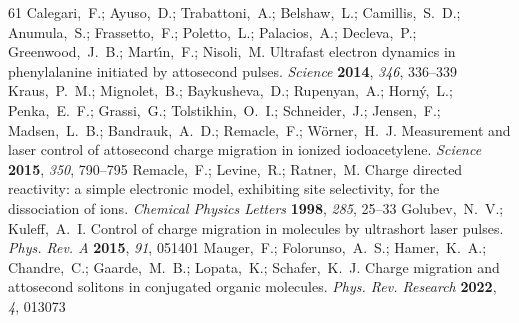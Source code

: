 \documentclass[journal=jacsat,manuscript=article]{achemso}
\begin{document}
\begin{mcitethebibliography}{61}
{\mcitedefaultendpunct}{\mcitedefaultseppunct}\relax
\EndOfBibitem
{}
Calegari,~F.; Ayuso,~D.; Trabattoni,~A.; Belshaw,~L.; Camillis,~S.~D.;
  Anumula,~S.; Frassetto,~F.; Poletto,~L.; Palacios,~A.; Decleva,~P.;
  Greenwood,~J.~B.; Mart\'{\i}n,~F.; Nisoli,~M. Ultrafast electron dynamics in
  phenylalanine initiated by attosecond pulses. \emph{Science} \textbf{2014},
  \emph{346}, 336--339\relax
\mciteBstWouldAddEndPuncttrue
\mciteSetBstMidEndSepPunct{\mcitedefaultmidpunct}
{\mcitedefaultendpunct}{\mcitedefaultseppunct}\relax
\EndOfBibitem
{}
Kraus,~P.~M.; Mignolet,~B.; Baykusheva,~D.; Rupenyan,~A.; Horn\'{y},~L.;
  Penka,~E.~F.; Grassi,~G.; Tolstikhin,~O.~I.; Schneider,~J.; Jensen,~F.;
  Madsen,~L.~B.; Bandrauk,~A.~D.; Remacle,~F.; Wörner,~H.~J. Measurement and
  laser control of attosecond charge migration in ionized iodoacetylene.
  \emph{Science} \textbf{2015}, \emph{350}, 790--795\relax
\mciteBstWouldAddEndPuncttrue
\mciteSetBstMidEndSepPunct{\mcitedefaultmidpunct}
{\mcitedefaultendpunct}{\mcitedefaultseppunct}\relax
\EndOfBibitem
{}
Remacle,~F.; Levine,~R.; Ratner,~M. Charge directed reactivity: a simple
  electronic model, exhibiting site selectivity, for the dissociation of ions.
  \emph{Chemical Physics Letters} \textbf{1998}, \emph{285}, 25--33\relax
\mciteBstWouldAddEndPuncttrue
\mciteSetBstMidEndSepPunct{\mcitedefaultmidpunct}
{\mcitedefaultendpunct}{\mcitedefaultseppunct}\relax
\EndOfBibitem
{}
Golubev,~N.~V.; Kuleff,~A.~I. Control of charge migration in molecules by
  ultrashort laser pulses. \emph{Phys. Rev. A} \textbf{2015}, \emph{91},
  051401\relax
\mciteBstWouldAddEndPuncttrue
\mciteSetBstMidEndSepPunct{\mcitedefaultmidpunct}
{\mcitedefaultendpunct}{\mcitedefaultseppunct}\relax
\EndOfBibitem
{}
Mauger,~F.; Folorunso,~A.~S.; Hamer,~K.~A.; Chandre,~C.; Gaarde,~M.~B.;
  Lopata,~K.; Schafer,~K.~J. Charge migration and attosecond solitons in
  conjugated organic molecules. \emph{Phys. Rev. Research} \textbf{2022},
  \emph{4}, 013073\relax

\end{mcitethebibliography}
\end{document}
